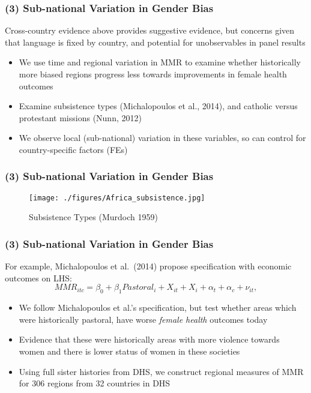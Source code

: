 \documentclass[10pt,letterpaper,subeqn]{beamer}
\begin{document}
\begin{frame}
\frametitle{(3) Sub-national Variation in Gender Bias}
Cross-country evidence above provides suggestive evidence, but concerns given
that language is fixed by country, and potential for unobservables in panel 
results
\vspace{5mm}
\begin{itemize}
  \item We use time and regional variation in MMR to examine whether historically
        more biased regions progress less towards improvements in female health
        outcomes
  \item Examine subsistence types (Michalopoulos et al., 2014), and catholic
        versus protestant missions (Nunn, 2012)
  \item We observe local (sub-national) variation in these variables, so can
        control for country-specific factors (FEs)
\end{itemize}
\end{frame}

\begin{frame}
\frametitle{(3) Sub-national Variation in Gender Bias}
\begin{figure}
\texttt{[image: ./figures/Africa\_subsistence.jpg]}
\caption{Subsistence Types (Murdoch 1959)}
\end{figure}
\end{frame}

\begin{frame}
\frametitle{(3) Sub-national Variation in Gender Bias}
For example, Michalopoulos et al.\ (2014) propose specification with economic
outcomes on LHS:
\vspace{2mm}
\begin{equation}
\label{eqn:SubType}
MMR_{itc} = \beta_0 + \beta_1 Pastoral_i + X_{it} + X_i + \alpha_t + \alpha_c + \nu_{it},
\end{equation}
\begin{itemize}
\item We follow Michalopoulos et al.'s specification, but test whether areas which
      were historically pastoral, have worse \emph{female health} outcomes today
\item Evidence that these were historically areas with more violence towards
      women and there is lower status of women in these societies
\item Using full sister histories from DHS, we construct regional measures
      of MMR for 306 regions from 32 countries in DHS
\end{itemize}
\end{frame}
\end{document}
